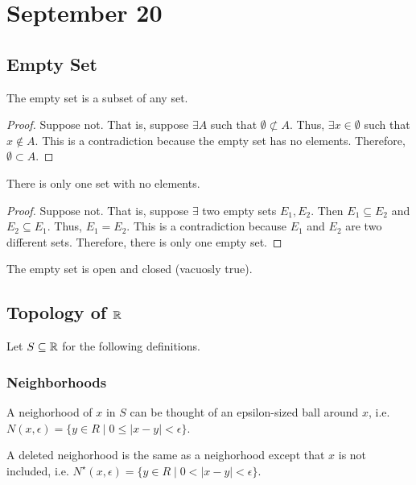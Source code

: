 \section{September 20}

\subsection{Empty Set}
\begin{theorem}
    The empty set is a subset of any set.
\end{theorem}
\begin{proof}
    Suppose not. That is, suppose $\exists A$ such that $\emptyset \not\subset A$. Thus, $\exists x \in \emptyset$ such that $x \not\in A$. This is a contradiction because the empty set has no elements. Therefore, $\emptyset \subset A$.
\end{proof}

\begin{theorem}
    There is only one set with no elements.
\end{theorem}
\begin{proof}
    Suppose not. That is, suppose $\exists$ two empty sets $E_1, E_2$. Then $E_1 \subseteq E_2$ and $E_2 \subseteq E_1$. Thus, $E_1 = E_2$. This is a contradiction because $E_1$ and $E_2$ are two different sets. Therefore, there is only one empty set.
\end{proof}
\begin{remark}
    The empty set is open and closed (vacuosly true).
\end{remark}


\subsection{Topology of $\mathbb{R}$}
Let $S \subseteq \mathbb{R}$ for the following definitions.

\subsubsection{Neighborhoods}
\begin{definition}[Neighorhood]
    A neighorhood of $x$ in $S$ can be thought of an epsilon-sized ball around $x$, i.e. $N(x, \epsilon) = \{ y \in R \mid 0 \leq |x - y| < \epsilon \}$.
\end{definition}
\begin{definition}
    A deleted neighorhood is the same as a neighorhood except that $x$ is not included, i.e. $N^\star(x, \epsilon) = \{ y \in R \mid 0 < |x - y| < \epsilon \}$.
\end{definition}

